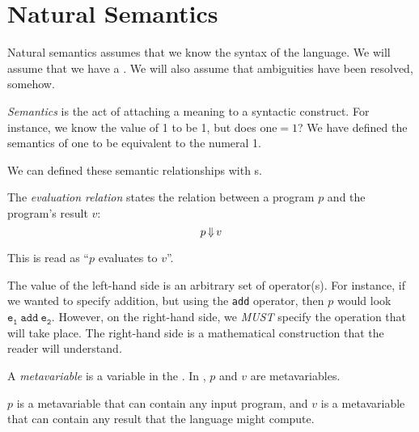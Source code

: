 \section{Natural Semantics}\label{sec:Natural_Semantics}
Natural semantics assumes that we know the syntax of the language.
We will assume that we have a  .
We will also assume that ambiguities have been resolved, somehow.

\begin{definition}[Semantics]\label{def:Semantics}
  \emph{Semantics} is the act of attaching a meaning to a syntactic construct.
  For instance, we know the value of 1 to be 1, but does $\text{one} = 1$?
  We have defined the semantics of $\text{one}$ to be equivalent to the numeral 1.

  We can defined these semantic relationships with s.
\end{definition}

\begin{definition}\label{def:Evaluation_Relation}
  The \emph{evaluation relation} states the relation between a program $p$ and the program's result $v$:
  \begin{equation}\label{eq:Evaluation_Relation}
    p \operatorname{\Downarrow} v
  \end{equation}

  This is read as ``$p$ evaluates to $v$''.

  \begin{remark}
    The value of the left-hand side is an arbitrary set of operator(s).
    For instance, if we wanted to specify addition, but using the \texttt{add} operator, then $p$ would look $\mathtt{e_{1} \: add \: e_{2}}$.
    However, on the right-hand side, we \emph{MUST} specify the operation that will take place.
    The right-hand side is a mathematical construction that the reader will understand.
  \end{remark}
\end{definition}

\begin{definition}[Metavariable]\label{def:Metavariable}
  A \emph{metavariable} is a variable in the .
  In , $p$ and $v$ are metavariables.
  
  $p$ is a metavariable that can contain any input program, and $v$ is a metavariable that can contain any result that the language might compute.
\end{definition}

